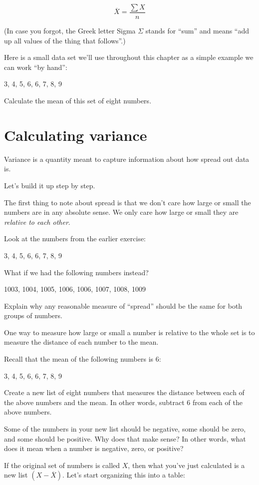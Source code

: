 \documentclass[
]{book}
\begin{document}
\[
\overline{X} = \frac{\sum{X}}{n}
\]

(In case you forgot, the Greek letter Sigma \(\Sigma\) stands for ``sum'' and means ``add up all values of the thing that follows''.)

Here is a small data set we'll use throughout this chapter as a simple example we can work ``by hand'':

3, 4, 5, 6, 6, 7, 8, 9

Calculate the mean of this set of eight numbers.

\hypertarget{variance-calculating}{%
\section{Calculating variance}\label{variance-calculating}}

Variance is a quantity meant to capture information about how spread out data is.

Let's build it up step by step.

The first thing to note about spread is that we don't care how large or small the numbers are in any absolute sense. We only care how large or small they are \emph{relative to each other}.

Look at the numbers from the earlier exercise:

3, 4, 5, 6, 6, 7, 8, 9

What if we had the following numbers instead?

1003, 1004, 1005, 1006, 1006, 1007, 1008, 1009

Explain why any reasonable measure of ``spread'' should be the same for both groups of numbers.

One way to measure how large or small a number is relative to the whole set is to measure the distance of each number to the mean.

Recall that the mean of the following numbers is 6:

3, 4, 5, 6, 6, 7, 8, 9

Create a new list of eight numbers that measures the distance between each of the above numbers and the mean. In other words, subtract 6 from each of the above numbers.

Some of the numbers in your new list should be negative, some should be zero, and some should be positive. Why does that make sense? In other words, what does it mean when a number is negative, zero, or positive?

If the original set of numbers is called \(X\), then what you've just calculated is a new list \(\left(X - \overline{X}\right)\). Let's start organizing this into a table:
\end{document}
